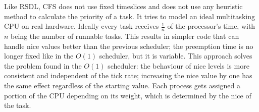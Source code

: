 Like RSDL, CFS does not use fixed timeslices and does not use any heuristic
method to calculate the priority of a task. It tries to model an ideal
multitasking CPU on real hardware. Ideally every task receives
$\frac 1n$ of the processor's time, with $n$ being the number of
runnable tasks. This results in simpler code that can handle nice
values better than the previous scheduler; the preemption time is no
longer fixed like in the $O(1)$ scheduler, but it is variable.\cite{cfs_design} This approach solves the problem found in the $O(1)$ scheduler: the behaviour of nice levels is more consistent and independent of the tick rate; increasing the nice value by one has the same effect regardless of the starting value. Each process gets
assigned a portion of the CPU depending on its weight, which is
determined by the nice of the task. %

